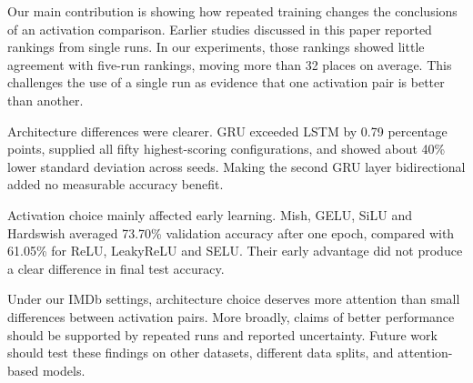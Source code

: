 \documentclass[conference,a4paper]{IEEEtran}
\begin{document}
Our main contribution is showing how repeated training changes
the conclusions of an activation comparison. Earlier studies
discussed in this paper reported rankings from single runs.
In our experiments, those rankings showed little agreement
with five-run rankings, moving more than 32 places on average.
This challenges the use of a single run as evidence that one
activation pair is better than another.

Architecture differences were clearer. GRU exceeded LSTM by
0.79 percentage points, supplied all fifty highest-scoring
configurations, and showed about 40\% lower standard deviation
across seeds. Making the second GRU layer bidirectional added
no measurable accuracy benefit.

Activation choice mainly affected early learning. Mish, GELU,
SiLU and Hardswish averaged 73.70\% validation accuracy after
one epoch, compared with 61.05\% for ReLU, LeakyReLU and SELU.
Their early advantage did not produce a clear difference in
final test accuracy.

Under our IMDb settings, architecture choice deserves more
attention than small differences between activation pairs.
More broadly, claims of better performance should be supported
by repeated runs and reported uncertainty. Future work should
test these findings on other datasets, different data splits,
and attention-based models.
\end{document}
